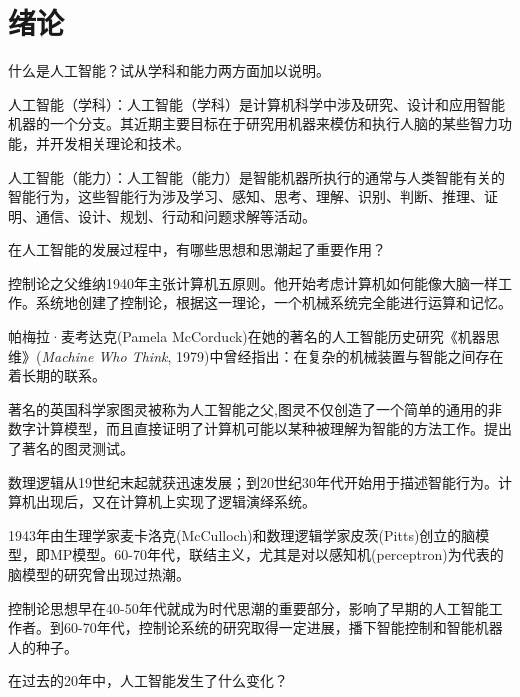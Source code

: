 \chapter{绪论}

\begin{question}
什么是人工智能？试从学科和能力两方面加以说明。
\end{question}	
\begin{solution}
人工智能（学科）：人工智能（学科）是计算机科学中涉及研究、设计和应用智能机器的一个分支。其近期主要目标在于研究用机器来模仿和执行人脑的某些智力功能，并开发相关理论和技术。\par
人工智能（能力）：人工智能（能力）是智能机器所执行的通常与人类智能有关的智能行为，这些智能行为涉及学习、感知、思考、理解、识别、判断、推理、证明、通信、设计、规划、行动和问题求解等活动。
\end{solution}

\begin{question}
在人工智能的发展过程中，有哪些思想和思潮起了重要作用？
\end{question}
\begin{solution}
控制论之父维纳1940年主张计算机五原则。他开始考虑计算机如何能像大脑一样工作。系统地创建了控制论，根据这一理论，一个机械系统完全能进行运算和记忆。\par
帕梅拉·麦考达克(Pamela McCorduck)在她的著名的人工智能历史研究《机器思维》(\textit{Machine Who Think}, 1979)中曾经指出：在复杂的机械装置与智能之间存在着长期的联系。\par
著名的英国科学家图灵被称为人工智能之父,图灵不仅创造了一个简单的通用的非数字计算模型，而且直接证明了计算机可能以某种被理解为智能的方法工作。提出了著名的图灵测试。\par
数理逻辑从19世纪末起就获迅速发展；到20世纪30年代开始用于描述智能行为。计算机出现后，又在计算机上实现了逻辑演绎系统。\par
1943年由生理学家麦卡洛克(McCulloch)和数理逻辑学家皮茨(Pitts)创立的脑模型，即MP模型。60-70年代，联结主义，尤其是对以感知机(perceptron)为代表的脑模型的研究曾出现过热潮。\par
控制论思想早在40-50年代就成为时代思潮的重要部分，影响了早期的人工智能工作者。到60-70年代，控制论系统的研究取得一定进展，播下智能控制和智能机器人的种子。 
\end{solution}

\begin{question}
在过去的20年中，人工智能发生了什么变化？
\end{question}
\begin{solution}
\end{solution}

